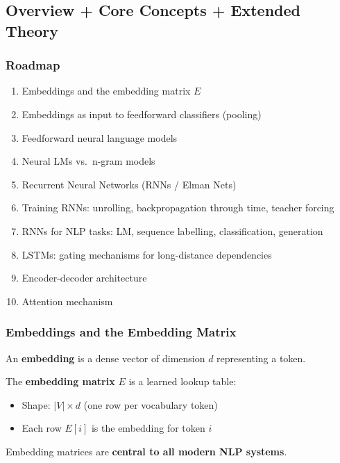 \separator

\subsection{Overview + Core Concepts + Extended Theory}

\subsubsection*{Roadmap}
\begin{enumerate}
  \item Embeddings and the embedding matrix $E$
  \item Embeddings as input to feedforward classifiers (pooling)
  \item Feedforward neural language models
  \item Neural LMs vs.\ n-gram models
  \item Recurrent Neural Networks (RNNs / Elman Nets)
  \item Training RNNs: unrolling, backpropagation through time, teacher forcing
  \item RNNs for NLP tasks: LM, sequence labelling, classification, generation
  \item LSTMs: gating mechanisms for long-distance dependencies
  \item Encoder-decoder architecture
  \item Attention mechanism
\end{enumerate}

\bigseparator

\subsubsection{Embeddings and the Embedding Matrix}

\begin{defbox}
An \textbf{embedding} is a dense vector of dimension $d$ representing a token.

The \textbf{embedding matrix} $E$ is a learned lookup table:
\begin{itemize}
  \item Shape: $|V| \times d$ (one row per vocabulary token)
  \item Each row $E[i]$ is the embedding for token $i$
\end{itemize}

Embedding matrices are \textbf{central to all modern NLP systems}.
\end{defbox}

